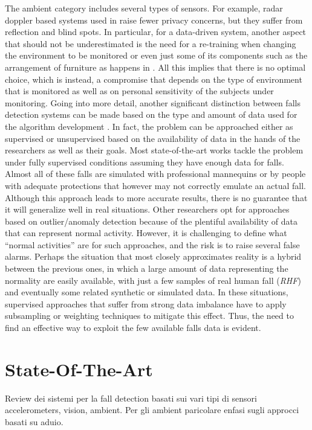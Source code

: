 The ambient category includes several types of sensors. For example, radar doppler based systems used in \cite{wu2015radar} raise fewer privacy concerns, but they suffer from reflection and blind spots. In particular, for a data-driven system, another aspect that should not be underestimated is the need for a re-training when changing the environment to be monitored or even just some of its components such as the arrangement of furniture as happens in \cite{liu2008vision}.
All this implies that there is no optimal choice, which is instead, a compromise that depends on the type of environment that is monitored as well as on personal sensitivity of the subjects under monitoring.
Going into more detail, another significant distinction between falls detection systems can be made based on the type and amount of data used for the algorithm development \cite{khan2017review}. In fact, the problem can be approached either as supervised or unsupervised based on the availability of data in the hands of the researchers as well as their goals. 
Most state-of-the-art works tackle the problem under fully supervised conditions assuming they have enough data for falls. Almost all of these falls are simulated with professional mannequins \cite{werner2011fall, zigel2009method}  or by people with adequate protections \cite{li2012microphone, popescu2008acoustic} that however may not correctly emulate an actual fall. Although this approach leads to more accurate results, there is no guarantee that it will generalize well in real situations. 
Other researchers opt for approaches based on outlier/anomaly detection \cite{khan2015unsupervised, zhang2009detecting, popescu2009acoustic} because of the plentiful availability of data that can represent normal activity. However, it is challenging to define what ``normal activities'' are for such approaches, and the risk is to raise several false alarms. %
Perhaps the situation that most closely approximates reality is a hybrid between the previous ones, in which a large amount of data representing the normality are easily available, with just a few samples of real human fall (\textit{RHF}) and eventually some related synthetic or simulated data. In these situations, supervised approaches that suffer from strong data imbalance have to apply subsampling \cite{stone2015fall} or weighting \cite{khan2017review} techniques to mitigate this effect. Thus, the need to find an effective way to exploit the few available falls data is evident.

\section{State-Of-The-Art} 
\label{sec:soa}
Review dei sistemi per la fall detection basati sui vari tipi di sensori
accelerometers, vision, ambient. Per gli ambient paricolare enfasi sugli approcci basati su aduio.

